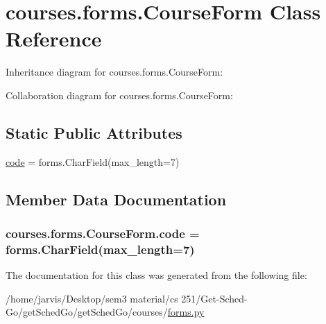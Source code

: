 \hypertarget{classcourses_1_1forms_1_1CourseForm}{}\section{courses.\+forms.\+Course\+Form Class Reference}
\label{classcourses_1_1forms_1_1CourseForm}


Inheritance diagram for courses.\+forms.\+Course\+Form\+:


Collaboration diagram for courses.\+forms.\+Course\+Form\+:
\subsection*{Static Public Attributes}
\begin{DoxyCompactItemize}
\item 
\hyperlink{classcourses_1_1forms_1_1CourseForm_a9767044ae5cffeca77a367516cc640c3}{code} = forms.\+Char\+Field(max\+\_\+length=7)
\end{DoxyCompactItemize}


\subsection{Member Data Documentation}
\subsubsection[{\texorpdfstring{code}{code}}]{\setlength{\rightskip}{0pt plus 5cm}courses.\+forms.\+Course\+Form.\+code = forms.\+Char\+Field(max\+\_\+length=7)\hspace{0.3cm}{\ttfamily [static]}}\hypertarget{classcourses_1_1forms_1_1CourseForm_a9767044ae5cffeca77a367516cc640c3}{}\label{classcourses_1_1forms_1_1CourseForm_a9767044ae5cffeca77a367516cc640c3}


The documentation for this class was generated from the following file\+:\begin{DoxyCompactItemize}
\item 
/home/jarvis/\+Desktop/sem3 material/cs 251/\+Get-\/\+Sched-\/\+Go/get\+Sched\+Go/get\+Sched\+Go/courses/\hyperlink{courses_2forms_8py}{forms.\+py}\end{DoxyCompactItemize}
